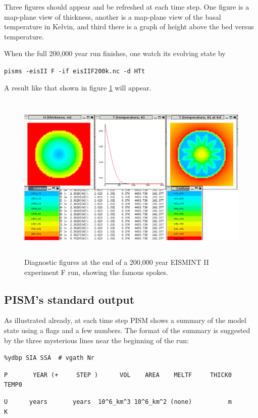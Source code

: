 \documentclass[11pt,final]{amsart}
\begin{document}
Three figures should appear and be refreshed at each time step.  One figure is a map-plane view of thickness, another is a map-plane view of the basal temperature in Kelvin, and third there is a graph of height above the bed versus temperature.

When the full 200,000 year run finishes, one watch its evolving state by

\verb|pisms -eisII F -if eisIIF200k.nc -d HTt|

\noindent A result like that shown in figure \ref{fig:screenshot} will appear.

\begin{figure}[ht]
\includegraphics[height=3.2in,keepaspectratio=true]{figs/eisIIFshot}
\caption{Diagnostic figures at the end of a 200,000 year EISMINT II experiment F run, showing the famous spokes.}
\label{fig:screenshot}
\end{figure}

\subsection{PISM's standard output}   As illustrated already, at each time step PISM shows a summary of the model state using a flags and a few numbers.  The format of the summary is suggested by the three mysterious lines near the beginning of the run:

\medskip
\small
\verb|%ydbp SIA SSA  # vgath Nr|

\verb|P       YEAR (+     STEP )      VOL    AREA    MELTF     THICK0     TEMP0|

\verb|U      years       years  10^6_km^3 10^6_km^2 (none)          m         K|
\normalsize
\medskip
\end{document}
